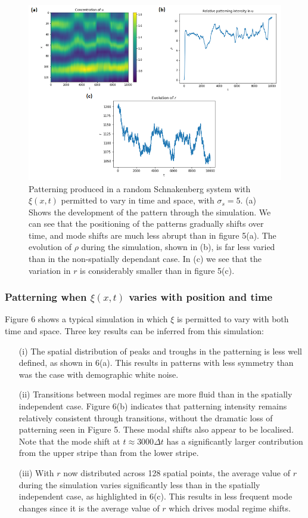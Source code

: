 \documentclass[12pt]{article}
\begin{document}
\begin{figure}
\begin{center}
  \includegraphics[scale = 0.75]{Fig_6.png}
  \caption{Patterning produced in a random Schnakenberg system with $\xi(x,t)$ permitted to vary in time and space, with $\sigma_s = 5$. (a) Shows the development of the pattern through the simulation. We can see that the positioning of the patterns gradually shifts over time, and mode shifts are much less abrupt than in figure 5(a). The evolution of $\rho$ during the simulation, shown in (b), is far less varied than in the non-spatially dependant case. In (c) we see that the variation in $r$ is considerably smaller than in figure 5(c).}
  \end{center}
\end{figure}

\subsubsection{Patterning when $\xi(x,t)$ varies with position and time}
Figure 6 shows a typical simulation in which $\xi$ is permitted to vary with both time and space. Three key results can be inferred from this simulation:
\begin{enumerate}
\item[(i)] The spatial distribution of peaks and troughs in the patterning is less well defined, as shown in 6(a). This results in patterns with less symmetry than was the case with demographic white noise.  
\item[(ii)] Transitions between modal regimes are more fluid than in the spatially independent case. Figure 6(b) indicates that patterning intensity remains relatively consistent through transitions, without the dramatic loss of patterning seen in Figure 5. These modal shifts also appear to be localised. Note that the mode shift at $t\approx3000\Delta t$ has a significantly larger contribution from the upper stripe than from the lower stripe. 
\item[(iii)] With $r$ now distributed across 128 spatial points, the average value of $r$ during the simulation varies significantly less than in the spatially independent case, as highlighted in 6(c). This results in less frequent mode changes since it is the average value of $r$ which drives modal regime shifts. 
\end{enumerate}
\end{document}
